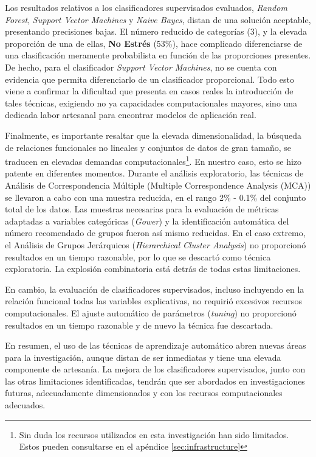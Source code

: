 \documentclass[a4paper, 11pt]{article}
\begin{document}
Los resultados relativos a los clasificadores supervisados evaluados, \textit{Random Forest}, 
\textit{Support Vector Machines} y \textit{Naive Bayes}, distan de una solución aceptable,
presentando precisiones bajas. El número reducido de categorías (3), y la elevada proporción
de una de ellas, \textbf{No Estrés} (53\%), hace complicado diferenciarse de una clasificación
meramente probabilista en función de las proporciones presentes. De hecho, para el 
clasificador \textit{Support Vector Machines}, no se cuenta con evidencia que permita 
diferenciarlo de un clasificador proporcional. Todo esto viene a confirmar la dificultad 
que presenta en casos reales la introducción de tales técnicas, exigiendo no ya capacidades
computacionales mayores, sino una dedicada labor artesanal para encontrar modelos de
aplicación real.

Finalmente, es importante resaltar que la elevada dimensionalidad, la búsqueda de relaciones
funcionales no lineales y conjuntos de datos de gran tamaño, se traducen en elevadas 
demandas computacionales\footnote{Sin duda los recursos utilizados en esta investigación
han sido limitados. Estos pueden consultarse en el apéndice \ref{sec:infrastructure}}.
En nuestro caso, esto se hizo patente en diferentes momentos. Durante el análisis
exploratorio, las técnicas de  Análisis de Correspondencia Múltiple (Multiple
Correspondence Analysis (MCA)) se llevaron a cabo con una muestra reducida, en el 
rango 2\% - 0.1\% del conjunto total de los datos. Las muestras necesarias para la
evaluación de métricas adaptadas a variables categóricas (\textit{Gower}) y la
identificación automática del número recomendado de grupos fueron así mismo reducidas. 
En el caso extremo, el Análisis de Grupos Jerárquicos (\textit{Hierarchical Cluster
Analysis}) no proporcionó resultados en un tiempo razonable, por lo que se descartó
como técnica exploratoria. La explosión combinatoria está detrás de todas estas limitaciones.

En cambio, la evaluación de clasificadores supervisados, incluso incluyendo en la 
relación funcional todas las variables explicativas, no requirió excesivos recursos 
computacionales. El ajuste automático de parámetros (\textit{tuning}) no proporcionó
resultados en un tiempo razonable y de nuevo la técnica fue descartada. 

En resumen, el uso de las técnicas de aprendizaje automático abren nuevas áreas para 
la investigación, aunque distan de ser inmediatas y tiene una elevada componente de 
artesanía. La mejora de los clasificadores supervisados, junto con las otras limitaciones 
identificadas, tendrán que ser abordados en investigaciones futuras, adecuadamente
dimensionados y con los recursos computacionales adecuados.
\end{document}
